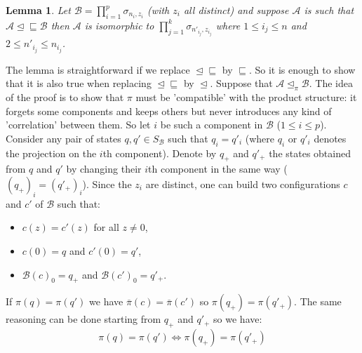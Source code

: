 \documentclass[a4paper]{elsarticle}
\newcommand{\ACA}{\mathcal{A}}
\newcommand{\ACB}{\mathcal{B}}
\newcommand\alphabe[1]{S_{#1}}
\newcommand{\alphB}{\alphabe{\ACB}}
\newcommand\sac{\sqsubseteq}
\newcommand{\fac}{\trianglelefteq}
\newcommand{\facsac}{\fac\!\sac}
\newcommand\shi[2]{\sigma_{{#1},{#2}}}
\newtheorem{lm}{Lemma}[section]
\begin{document}
\begin{lm}
  \label{lm:soushi}
  Let $\ACB = \prod_{i=1}^p \shi{n_i}{z_i}$ (with $z_i$ all distinct)
  and suppose $\ACA$ is such that $\ACA\facsac\ACB$ then $\ACA$ is
  isomorphic to ${\prod_{j=1}^k\shi{n'_{i_j}}{z_{i_j}}}$ where ${1\leq
    i_j\leq n}$ and ${2\leq n'_{i_j}\leq n_{i_j}}$.
\end{lm}
\begin{pf}
  The lemma is straightforward if we replace $\facsac$ by $\sac$. So
  it is enough to show that it is also true when replacing $\facsac$
  by $\fac$. Suppose that ${\ACA\fac_\pi\ACB}$.  The idea of the proof
  is to show that $\pi$ must be 'compatible' with the product
  structure: it forgets some components and keeps others but never
  introduces any kind of 'correlation' between them.  So let $i$ be
  such a component in $\ACB$ (${1\leq i\leq p}$). Consider any pair of
  states ${q,q'\in\alphB}$ such that ${q_i = q'_i}$ (where $q_i$ or
  $q'_i$ denotes the projection on the $i$th component). Denote by
  $q_+$ and $q'_+$ the states obtained from $q$ and $q'$ by changing
  their $i$th component in the same way ($(q_+)_i=(q'_+)_i$). 
  Since the $z_i$ are distinct, one can build two
  configurations $c$ and $c'$ of $\ACB$ such that:
  \begin{itemize}
  \item $c(z)=c'(z)$ for all $z\not=0$,
  \item $c(0)=q$ and $c'(0)=q'$,
  \item $\ACB(c)_0=q_+$ and $\ACB(c')_0=q'_+$.
  \end{itemize}
  If $\pi(q)=\pi(q')$ we have $\overline\pi(c)=\overline\pi(c')$ so
  $\pi(q_+) = \pi(q'_+)$. The same reasoning can be done starting from
  $q_+$ and $q'_+$ so we have:
  \[\pi(q) = \pi(q') \iff \pi(q_+) = \pi(q'_+)\]
  

\end{pf}
\end{document}

